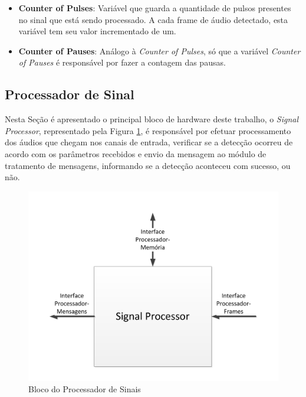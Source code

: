 \documentclass[monografia]{subfiles}
\begin{document}
		\begin{itemize}
		\item \textbf{Counter of Pulses}:
			Variável que guarda a quantidade de pulsos presentes no sinal que está sendo processado. A cada frame de áudio detectado, 
			esta variável tem seu valor incrementado de um. 
		\end{itemize}

		\begin{itemize}
		\item \textbf{Counter of Pauses}:
			Análogo à \textit{Counter of Pulses}, só que a variável \textit{Counter of Pauses} é responsável por fazer a contagem das pausas.
		\end{itemize}

	\newpage

	\subsection{Processador de Sinal}
	\label{sec:signalProcessSection}


	Nesta Seção é apresentado o principal bloco de hardware deste trabalho, o \textit{Signal Processor},  representado pela
	Figura \ref{fig:signalProcessorBlock}, é responsável por efetuar processamento
	dos áudios que chegam nos canais de entrada, verificar se a detecção ocorreu de acordo com os parâmetros recebidos e envio da mensagem ao módulo 
	de tratamento de mensagens, informando se a detecção aconteceu com sucesso, ou não. 

		\begin{figure}[!h]
		\centering 
		\includegraphics[scale=0.6]{img/modulos/mod_signalProcess.pdf}
		\caption{Bloco do Processador de Sinais}
		\label{fig:signalProcessorBlock}
		\end{figure}
\end{document}

